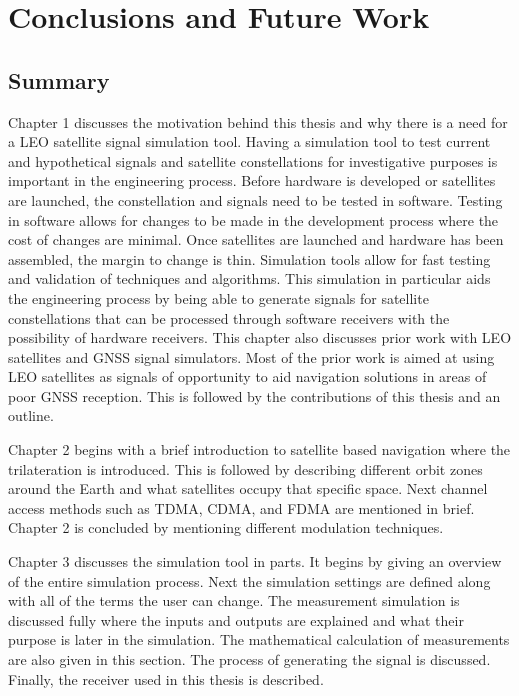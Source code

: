\documentclass[12pt]{report}
\begin{document}
\chapter{Conclusions and Future Work}
\section{Summary}
Chapter 1 discusses the motivation behind this thesis and why there is a need for a LEO satellite signal simulation tool. Having a simulation tool to test current and hypothetical signals and satellite constellations for investigative purposes is important in the engineering process. Before hardware is developed or satellites are launched, the constellation and signals need to be tested in software. Testing in software allows for changes to be made in the development process where the cost of changes are minimal. Once satellites are launched and hardware has been assembled, the margin to change is thin. Simulation tools allow for fast testing and validation of techniques and algorithms. This simulation in particular aids the engineering process by being able to generate signals for satellite constellations that can be processed through software receivers with the possibility of hardware receivers. This chapter also discusses prior work with LEO satellites and GNSS signal simulators. Most of the prior work is aimed at using LEO satellites as signals of opportunity to aid navigation solutions in areas of poor GNSS reception. This is followed by the contributions of this thesis and an outline. 

Chapter 2 begins with a brief introduction to satellite based navigation where the trilateration is introduced. This is followed by describing different orbit zones around the Earth and what satellites occupy that specific space. Next channel access methods such as TDMA, CDMA, and FDMA are mentioned in brief. Chapter 2 is concluded by mentioning different modulation techniques. 

Chapter 3 discusses the simulation tool in parts. It begins by giving an overview of the entire simulation process. Next the simulation settings are defined along with all of the terms the user can change. The measurement simulation is discussed fully where the inputs and outputs are explained and what their purpose is later in the simulation. The mathematical calculation of measurements are also given in this section. The process of generating the signal is discussed. Finally, the receiver used in this thesis is described.
\end{document}
